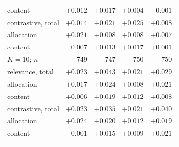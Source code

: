 \begin{tabular}{lrrrr}
\quad content & $\mathit{+0.012}$ & $\mathit{+0.017}$ & $+0.004$ & $-0.001$ \\
contrastive, total & $+0.014$ & $\mathit{+0.021}$ & $\mathit{+0.025}$ & $+0.008$ \\
\quad allocation & $\mathbf{+0.021}$ & $+0.008$ & $+0.008$ & $+0.007$ \\
\quad content & $-0.007$ & $\mathit{+0.013}$ & $\mathbf{+0.017}$ & $+0.001$ \\
\addlinespace
$K=10$; $n$ & 749 & 747 & 750 & 750 \\
relevance, total & $\mathit{+0.023}$ & $\mathit{+0.043}$ & $+0.021$ & $\mathit{+0.029}$ \\
\quad allocation & $+0.017$ & $\mathbf{+0.024}$ & $+0.008$ & $\mathbf{+0.021}$ \\
\quad content & $+0.006$ & $+0.019$ & $+0.012$ & $+0.008$ \\
contrastive, total & $\mathit{+0.023}$ & $\mathit{+0.035}$ & $+0.021$ & $\mathit{+0.040}$ \\
\quad allocation & $\mathbf{+0.024}$ & $\mathit{+0.020}$ & $+0.012$ & $\mathbf{+0.019}$ \\
\quad content & $-0.001$ & $+0.015$ & $+0.009$ & $\mathbf{+0.021}$ \\
\addlinespace
\bottomrule
\end{tabular}
